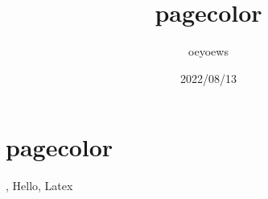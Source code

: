 \documentclass{article}
\title{pagecolor \emoji{rocket}}
\author{oeyoews}
\date{2022/08/13}
\begin{document}
\maketitle

\section{pagecolor }%
\label{sec:emoji}

, Hello, Latex
\end{document}

